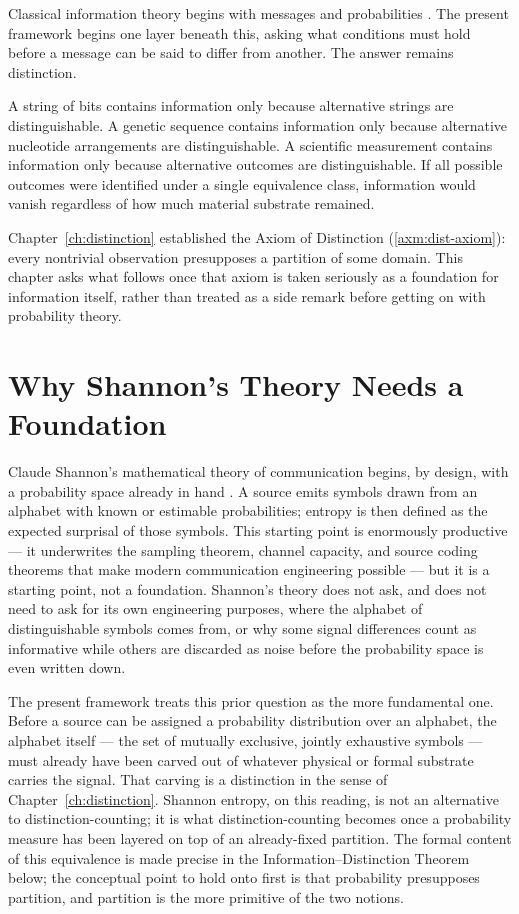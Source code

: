 \documentclass[12pt,twoside,openright]{book}
\begin{document}
Classical information theory begins with messages and
probabilities \parencite{shannon1948,cover2006}.
The present framework begins one layer beneath this,
asking what conditions must hold before a message can
be said to differ from another. The answer remains
distinction. 

A string of bits contains information only because
alternative strings are distinguishable. A genetic
sequence contains information only because alternative
nucleotide arrangements are distinguishable. A scientific
measurement contains information only because alternative
outcomes are distinguishable. If all possible outcomes
were identified under a single equivalence class,
information would vanish regardless of how much material
substrate remained.

Chapter~\ref{ch:distinction} established the Axiom of
Distinction (\cref{axm:dist-axiom}): every nontrivial
observation presupposes a partition of some domain. This
chapter asks what follows once that axiom is taken seriously
as a foundation for information itself, rather than treated
as a side remark before getting on with probability theory.

\section{Why Shannon's Theory Needs a Foundation}
\label{sec:ch2-shannon-foundation}

Claude Shannon's mathematical theory of communication begins,
by design, with a probability space already in hand
\parencite{shannon1948,shannon1949}. A source emits symbols
drawn from an alphabet with known or estimable probabilities;
entropy is then defined as the expected surprisal of those
symbols. This starting point is enormously productive --- it
underwrites the sampling theorem, channel capacity, and
source coding theorems that make modern communication
engineering possible \parencite{cover2006,mackay2003} --- but
it is a starting point, not a foundation. Shannon's theory
does not ask, and does not need to ask for its own engineering
purposes, where the alphabet of distinguishable symbols comes
from, or why some signal differences count as informative
while others are discarded as noise before the probability
space is even written down.

The present framework treats this prior question as the more
fundamental one. Before a source can be assigned a probability
distribution over an alphabet, the alphabet itself --- the set
of mutually exclusive, jointly exhaustive symbols --- must
already have been carved out of whatever physical or formal
substrate carries the signal. That carving is a distinction in
the sense of Chapter~\ref{ch:distinction}. Shannon entropy, on
this reading, is not an alternative to distinction-counting; it
is what distinction-counting becomes once a probability measure
has been layered on top of an already-fixed partition. The
formal content of this equivalence is made precise in the
Information--Distinction Theorem below; the conceptual point to
hold onto first is that probability presupposes partition, and
partition is the more primitive of the two notions.
\end{document}

